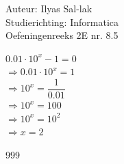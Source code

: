 \documentclass[a4paper]{article}
\begin{document}
\noindent \large Auteur: Ilyas Sal-lak \\
\noindent \large Studierichting: Informatica\\
\noindent \large Oefeningenreeks 2E nr. 8.5\\


\normalsize

$0.01 \cdot 10^x - 1 = 0$ \\

$\Rightarrow 0.01 \cdot 10^x = 1$ \\

$\Rightarrow 10^x = \dfrac{1}{0.01}$ \\

$\Rightarrow 10^x = 100$ \\

$\Rightarrow 10^x = 10^2$ \\

$\Rightarrow x = 2$

\begin{thebibliography}{999}
\end{thebibliography}
\end{document}
